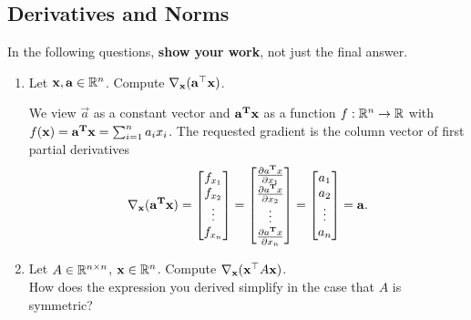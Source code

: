\subsection{Derivatives and Norms}
In the following questions, \textbf{show your work}, not just the final answer.
\begin{enumerate}[label=(\alph*)]
    \item Let $\mathbf x, \mathbf a \in \mathbb{R}^n$. Compute $\nabla_\mathbf x(\mathbf a^{\top}\mathbf x)$.
    \begin{mdframed}
      We view $\vec a$ as a constant vector and $\mathbf a^{\mathbf{T}} \mathbf x$ as a function
      $f:\mathbb{R}^n \rightarrow \mathbb{R}$ with $f(\mathbf x) = \mathbf a^{\mathbf{T}} \mathbf x = \sum_{i=1}^n a_ix_i$. The
      requested gradient is the column vector of first partial derivatives
      \begin{align*}
        \nabla_\mathbf x(\mathbf a^{\mathbf{T}} \mathbf x)
        = \begin{bmatrix}f_{x_1}\\f_{x_2}\\ \vdots\\f_{x_n}\end{bmatrix}
        = \begin{bmatrix}\frac{\partial a^{\mathbf{T}} x}{\partial x_1}\\ \frac{\partial a^{\mathbf{T}} x}{\partial x_2}\\ \vdots\\\frac{\partial a^{\mathbf{T}} x}{\partial x_n}\\\end{bmatrix}
        = \begin{bmatrix}a_1\\a_2\\ \vdots\\a_n\end{bmatrix}
        = \mathbf a.
      \end{align*}
    \end{mdframed}

  \item Let $A \in \mathbb{R}^{n\times n}$, $\mathbf x \in \mathbb{R}^n$. Compute $\nabla_\mathbf x(\mathbf x^{\top} A\mathbf x)$. \\
    How does the expression you derived simplify in the case that $A$ is symmetric? \\


\end{enumerate}
